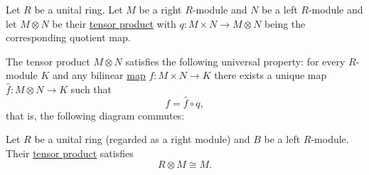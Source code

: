 \begin{theorem}\label{thm:tensor_product_universal_property}\mcite\cite[thm. 10.18]{Knapp2016BasicAlgebra}
  Let \( R \) be a unital ring. Let \( M \) be a right \( R \)-module and \( N \) be a left \( R \)-module and let \( M \otimes N \) be their \hyperref[def:left_module_tensor_product]{tensor product} with \( q: M \times N \to M \otimes N \) being the corresponding quotient map.

  The tensor product \( M \otimes N \) satisfies the following universal property: for every \( R \)-module \( K \) and any bilinear \hyperref[def:multilinear_function]{map} \( f: M \times N \to K \) there exists a unique map \( \hat f: M \otimes N \to K \) such that
  \begin{equation*}
    f = \hat f \circ q,
  \end{equation*}
  that is, the following diagram commutes:

  \begin{alignedeq}\label{thm:tensor_product_universal_property/diagram}
    \iffalse\begin{mplibcode}
      beginfig(1);
      input metapost/graphs;

      v1 := thelabel("$M \times N$", origin);
      v2 := thelabel("$M \otimes N$", (2, 0) scaled u);
      v3 := thelabel("$K$", (1, -1) scaled u);

      a1 := straight_arc(v1, v2);
      a2 := straight_arc(v2, v3);
      a3 := straight_arc(v1, v3);

      draw_vertices(v);
      draw_arcs(a);

      label.top("$q$", straight_arc_midpoint of a1);
      label.lrt("$\hat f$", straight_arc_midpoint of a2);
      label.llft("$f$", straight_arc_midpoint of a3);
      endfig;
    \end{mplibcode}\fi
  \end{alignedeq}
\end{theorem}

\begin{proposition}\label{thm:tensor_product_with_underlying_ring}\mcite\cite[677]{Knapp2016BasicAlgebra}
  Let \( R \) be a unital ring (regarded as a right module) and \( B \) be a left \( R \)-module. Their \hyperref[def:left_module_tensor_product]{tensor product} satisfies
  \begin{equation*}
    R \otimes M \cong M.
  \end{equation*}
\end{proposition}

